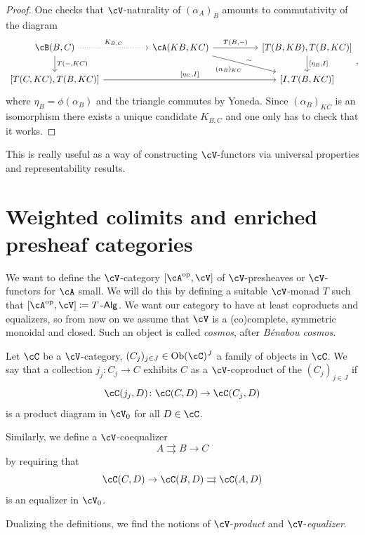 \documentclass[a4paper,11pt,oneside,openany]{scrbook}
\begin{document}
\begin{proof}
	One checks that $\cV$-naturality of $(\alpha_A)_B$ amounts to commutativity of the diagram
	\[
		\begin{tikzcd}[column sep = 5em]
			\cB(B,C)\ar[r, dotted, "K_{B,C}"]\ar[d, "{T(-,KC)}"]
			& \cA(KB,KC)\ar[r, "{T(B,-)}"]\ar[dr, "\sim"', swap, "{(\alpha_B)_{KC}}"]
			& {[T(B,KB),T(B,KC)]}\ar[d, "{[\eta_B, I]}"] \\
			{[T(C,KC),T(B,KC)]}\ar[rr, "{[\eta_C,I]}"]
			&& {[I,T(B,KC)]}
		\end{tikzcd}
		,\]
	where $\eta_B=\phi(\alpha_B)$ and the triangle commutes by Yoneda. Since $(\alpha_B)_{KC}$ is an isomorphism there exists a unique candidate $K_{B,C}$ and one only has to check that it works.
\end{proof}

\begin{rmk}
	This is really useful as a way of constructing $\cV$-functors via universal properties and representability results.
\end{rmk}

\section{Weighted colimits and enriched presheaf categories}

We want to define the $\cV$-category $[\cA^{\op},\cV]$ of $\cV$-presheaves or
$\cV$-functors for $\cA$ small. We will do this by defining a suitable
$\cV$-monad $T$ such that $[\cA^{\op},\cV]\coloneqq T\Alg$. We want our category
to have at least coproducts and equalizers, so from now on we assume that $\cV$
is a (co)complete, symmetric monoidal and closed. Such an object is called
\emph{cosmos}, after \emph{B\'enabou cosmos}.

\begin{defn}
	Let $\cC$ be a $\cV$-category, $(C_j)_{j\in J}\in\Ob(\cC)^J$ a family of
    objects in $\cC$. We say that a collection $j_j\colon C_j\rightarrow C$
    exhibits $C$ as a $\cV$-coproduct of the $(C_j)_{j\in J}$
    if$$\cC(j_j,D)\colon\cC(C,D)\rightarrow\cC(C_j,D)$$is a product diagram in
    $\cV_0$ for all $D\in\cC$.

	Similarly, we define a $\cV$-coequalizer$$A\rightrightarrows B\rightarrow
    C$$ by requiring that
    $$\cC(C,D)\rightarrow\cC(B,D)\rightrightarrows\cC(A,D)$$is an equalizer in
    $\cV_0$.

	Dualizing the definitions, we find the notions of $\cV$-\emph{product} and
    $\cV$-\emph{equalizer}.
\end{defn}
\end{document}
